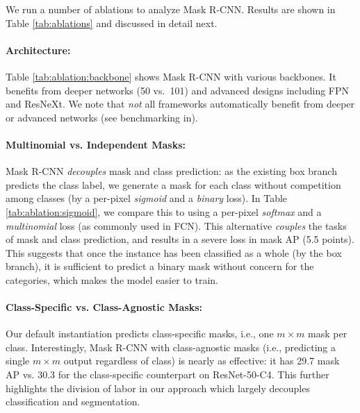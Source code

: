 \label{sec:ablations}

We run a number of ablations to analyze Mask R-CNN. Results are shown in Table \ref{tab:ablations} and discussed in detail next.

\paragraph{Architecture:} Table \ref{tab:ablation:backbone} shows Mask R-CNN with various backbones. It benefits from deeper networks (50 vs.~101) and advanced designs  including FPN and ResNeXt. We note that \emph{not} all frameworks automatically benefit from deeper or advanced networks (see benchmarking in).

\paragraph{Multinomial vs. Independent Masks:} Mask R-CNN \emph{decouples} mask and class prediction: as the existing box branch predicts the class label, we generate a mask for each class without competition among classes (by a per-pixel \emph{sigmoid} and a \emph{binary} loss). In Table \ref{tab:ablation:sigmoid}, we compare this to using a per-pixel \emph{softmax} and a \emph{multinomial} loss (as commonly used in FCN). This alternative \emph{couples} the tasks of mask and class prediction, and results in a severe loss in mask AP (5.5 points). This suggests that once the instance has been classified as a whole (by the box branch), it is sufficient to predict a binary mask without concern for the categories, which makes the model easier to train.

\paragraph{Class-Specific vs. Class-Agnostic Masks:} Our default instantiation predicts class-specific masks, i.e., one $m \times m$ mask per class. Interestingly, Mask R-CNN with class-agnostic masks (i.e., predicting a single $m \times m$ output regardless of class) is nearly as effective: it has 29.7 mask AP vs. 30.3 for the class-specific counterpart on ResNet-50-C4. This further highlights the division of labor in our approach which largely decouples classification and segmentation.

